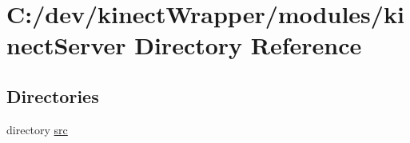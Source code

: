 \section{C\+:/dev/kinect\+Wrapper/modules/kinect\+Server Directory Reference}
\label{dir_65d72078f2cb6a873d9d899efb0a00ca}
\subsection*{Directories}
\begin{DoxyCompactItemize}
\item 
directory \hyperlink{dir_a1b31a03c5999012deeb52e88e48b55d}{src}
\end{DoxyCompactItemize}
